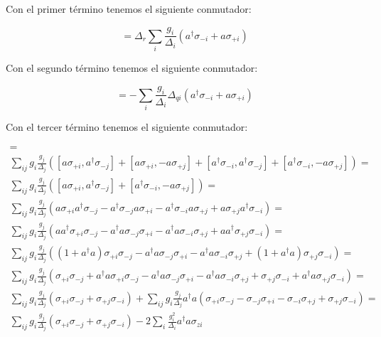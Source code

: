 Con el primer término tenemos el siguiente conmutador:

\begin{equation}
    [\Delta_r a^\dagger a, \sum\limits_i \frac{g_i} {\Delta_i} (a^\dagger \sigma_{-i} - a \sigma_{+i})] = \Delta_r \sum\limits_i \frac{g_i} {\Delta_i} (a^\dagger \sigma_{-i} + a \sigma_{+i})
\end{equation}

Con el segundo término tenemos el siguiente conmutador:

\begin{equation}
    [- \frac{1}{2} \sum\limits_i \Delta_{qi} \sigma_{zi}, \sum\limits_i \frac{g_i} {\Delta_i} (a^\dagger \sigma_{-i} - a \sigma_{+i})] = - \sum\limits_i \frac{g_i} {\Delta_i} \Delta_{qi} (a^\dagger \sigma_{-i} + a \sigma_{+i})
\end{equation}

Con el tercer término tenemos el siguiente conmutador:

\begin{multline}
[\sum\limits_i g_i (a \sigma_{+i} + a^\dagger \sigma_{-i}), \sum\limits_j \frac{g_j} {\Delta_j} (a^\dagger \sigma_{-j} - a \sigma_{+j})] = \\
\sum\limits_{ij} g_i \frac{g_j}{\Delta_j} \left([ a \sigma_{+i}, a^\dagger \sigma_{-j}] +
[a \sigma_{+i}, - a \sigma_{+j}] +
[a^\dagger \sigma_{-i}, a^\dagger \sigma_{-j}] +
[a^\dagger \sigma_{-i}, - a \sigma_{+j}]\right) =\\
\sum\limits_{ij} g_i \frac{g_j}{\Delta_j} \left([ a \sigma_{+i}, a^\dagger \sigma_{-j}] +
[a^\dagger \sigma_{-i}, - a \sigma_{+j}]\right) =\\
\sum\limits_{ij} g_i \frac{g_j}{\Delta_j} \left(
    a \sigma_{+i} a^\dagger \sigma_{-j} - a^\dagger \sigma_{-j} a \sigma_{+i}
    - a^\dagger \sigma_{-i} a \sigma_{+j} + a \sigma_{+j} a^\dagger \sigma_{-i}\right) =\\
\sum\limits_{ij} g_i \frac{g_j}{\Delta_j} \left(
    a a^\dagger \sigma_{+i} \sigma_{-j} - a^\dagger a \sigma_{-j} \sigma_{+i}
    - a^\dagger a \sigma_{-i} \sigma_{+j} + a a^\dagger \sigma_{+j} \sigma_{-i}\right) =\\
\sum\limits_{ij} g_i \frac{g_j}{\Delta_j} \left(
    (1 + a^\dagger a) \sigma_{+i} \sigma_{-j} - a^\dagger a \sigma_{-j} \sigma_{+i}
    - a^\dagger a \sigma_{-i} \sigma_{+j} + (1 + a^\dagger a) \sigma_{+j} \sigma_{-i}\right) =\\
\sum\limits_{ij} g_i \frac{g_j}{\Delta_j} \left(
    \sigma_{+i} \sigma_{-j} + a^\dagger a \sigma_{+i} \sigma_{-j} - a^\dagger a \sigma_{-j} \sigma_{+i}
    - a^\dagger a \sigma_{-i} \sigma_{+j} + \sigma_{+j} \sigma_{-i} + a^\dagger a \sigma_{+j} \sigma_{-i}\right) =\\
\sum\limits_{ij} g_i \frac{g_j}{\Delta_j} \left(\sigma_{+i} \sigma_{-j} + \sigma_{+j} \sigma_{-i}\right) +
\sum\limits_{ij} g_i \frac{g_j}{\Delta_j} a^\dagger a \left(
    \sigma_{+i} \sigma_{-j} - \sigma_{-j} \sigma_{+i}
    - \sigma_{-i} \sigma_{+j} + \sigma_{+j} \sigma_{-i}\right) =\\
\sum\limits_{ij} g_i \frac{g_j}{\Delta_j} \left(\sigma_{+i} \sigma_{-j} + \sigma_{+j} \sigma_{-i}\right) -
2 \sum\limits_{i} \frac{g_i^2}{\Delta_i} a^\dagger a \sigma_{zi}
\end{multline}

